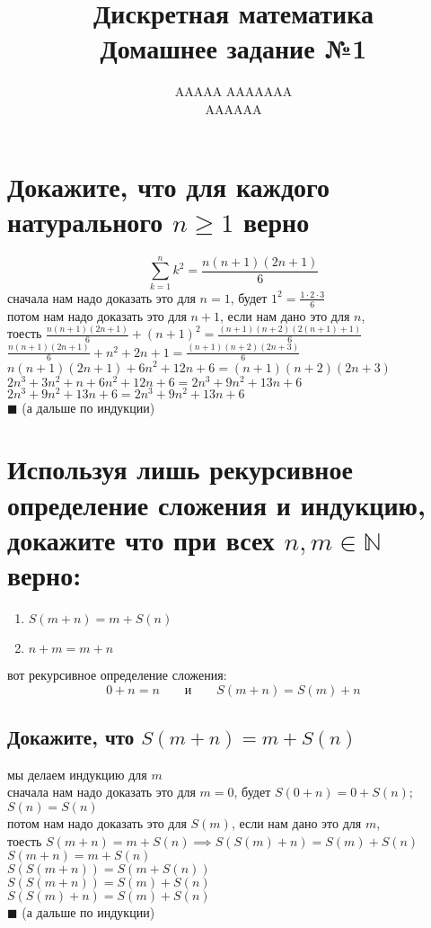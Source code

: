 \documentclass{article}
\title{Дискретная математика \\ Домашнее задание №1}
\author{AAAAA AAAAAAA \\ AAAAAA}
\newcommand{\ds}{\displaystyle}
\begin{document}
  \maketitle

  \section{Докажите, что для каждого натурального $n \geq 1$ верно}
  $$\sum_{k=1}^n k^2 = \frac{n(n+1)(2n+1)}{6}$$
  сначала нам надо доказать это для $n=1$, будет $\ds 1^2 = \frac{1 \cdot 2 \cdot 3}{6}$ \\
  потом нам надо доказать это для $n+1$, если нам дано это для $n$, \\
  тоесть $\ds \frac{n(n+1)(2n+1)}{6} + (n+1)^2 = \frac{(n+1)(n+2)(2(n+1)+1)}{6}$ \\
  $\ds \frac{n(n+1)(2n+1)}{6} + n^2 + 2n + 1 = \frac{(n+1)(n+2)(2n+3)}{6}$ \\
  $\ds n(n+1)(2n+1) + 6n^2 + 12n + 6 = (n+1)(n+2)(2n+3)$ \\
  $\ds 2n^3 + 3n^2 + n + 6n^2 + 12n + 6 = 2n^3 + 9n^2 + 13n + 6$ \\
  $\ds 2n^3 + 9n^2 + 13n + 6 = 2n^3 + 9n^2 + 13n + 6$ \\
  $\blacksquare$ (а дальше по индукции)

  \section{Используя лишь рекурсивное определение сложения и индукцию, докажите что при всех $n, m \in \mathbb{N}$ верно:}
  \begin{center}
    \begin{varwidth}{\textwidth}
      \begin{enumerate}
        \item $S(m+n) = m+S(n)$
        \item $n+m = m+n$
      \end{enumerate}
    \end{varwidth}
  \end{center}
  вот рекурсивное определение сложения:
  $$ 0+n=n \qquad \textrm{и} \qquad S(m+n) = S(m)+n $$
  \subsection{Докажите, что $S(m+n) = m+S(n)$}
  \label{recsymetry}
  мы делаем индукцию для $m$ \\
  сначала нам надо доказать это для $m=0$, будет $ S(0+n) = 0+S(n) $; $S(n)=S(n)$ \\
  потом нам надо доказать это для $S(m)$, если нам дано это для $m$, \\
  тоесть $ S(m+n) = m+S(n) \implies S(S(m)+n) = S(m)+S(n) $ \\
  $ S(m+n) = m+S(n) $ \\
  $ S(S(m+n)) = S(m+S(n)) $ \\
  $ S(S(m+n)) = S(m)+S(n) $ \\
  $ S(S(m)+n) = S(m)+S(n) $ \\
  $\blacksquare$ (а дальше по индукции)
\end{document}
